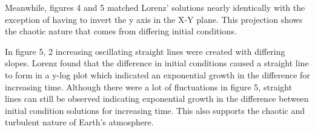 \documentclass{article}
\begin{document}
Meanwhile, figures 4 and 5 matched Lorenz' solutions nearly identically with the exception of having to invert the y axis in the X-Y plane. This projection shows the chaotic nature that comes from differing initial conditions.

In figure 5, 2 increasing oscillating straight lines were created with differing slopes. Lorenz found that the difference in initial conditions caused a straight line to form in a y-log plot which indicated an exponential growth in the difference for increasing time. Although there were a lot of fluctuations in figure 5, straight lines can still be observed indicating exponential growth in the difference between initial condition solutions for increasing time. This also supports the chaotic and turbulent nature of Earth's atmosphere. 
\end{document}
